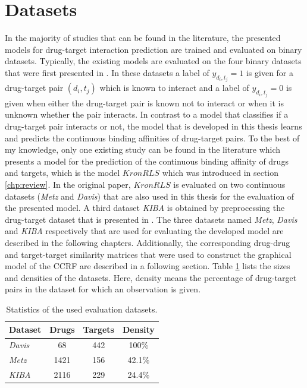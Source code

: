 \section{Datasets}
\label{sec:datasets}
In the majority of studies that can be found in the literature, the presented models for drug-target interaction prediction are trained and evaluated on binary datasets. Typically, the existing models are evaluated on the four binary datasets that were first presented in \cite{yamanishi2010drug}. In these datasets a label of $y_{d_i, t_j} = 1$ is given for a drug-target pair $(d_i, t_j)$ which is known to interact and a label of $y_{d_i, t_j} = 0$ is given when either the drug-target pair is known not to interact or when it is unknown whether the pair interacts. In contrast to a model that classifies if a drug-target pair interacts or not, the model that is developed in this thesis learns and predicts the continuous binding affinities of drug-target pairs. To the best of my knowledge, only one existing study can be found in the literature which presents a model for the prediction of the continuous binding affinity of drugs and targets, which is the model $KronRLS$ \cite{pahikkala2014toward} which was introduced in section \ref{chp:review}. In the original paper, $KronRLS$ is evaluated on two continuous datasets (\textit{Metz} and \textit{Davis}) that are also used in this thesis for the evaluation of the presented model. A third dataset \textit{KIBA} is obtained by preprocessing the drug-target dataset that is presented in \cite{tang2014making}.
The three datasets named \textit{Metz}, \textit{Davis} and \textit{KIBA} respectively that are used for evaluating the developed model are described in the following chapters. Additionally, the corresponding drug-drug and target-target similarity matrices that were used to construct the graphical model of the CCRF are described in a following section. Table \ref{dataset_stats} lists the sizes and densities of the datasets. Here, density means the percentage of drug-target pairs in the dataset for which an observation is given.

\begin{table}[]
\centering
\begin{tabular}{l c c c}
Dataset & Drugs & Targets & Density \\
\hline
\textit{Davis} & 68 & 442 & 100\%\\
\textit{Metz} & 1421 & 156 & 42.1\%\\
\textit{KIBA} & 2116 & 229 & 24.4\%\\
\end{tabular}
\caption{Statistics of the used evaluation datasets.}
\label{dataset_stats}
\end{table}


